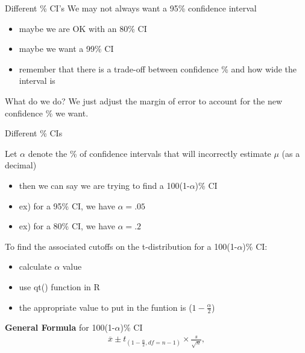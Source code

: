 \documentclass{beamer}
\begin{document}
\begin{frame}{Different \% CI's}
We may not always want a 95\% confidence interval
\begin{itemize}
    \item maybe we are OK with an 80\% CI
    \item maybe we want a 99\% CI
    \item remember that there is a trade-off between confidence \% and how wide the interval is
\end{itemize} \vspace{10mm}

What do we do? We just adjust the margin of error to account for the new confidence \% we want.
\end{frame}

\begin{frame}{Different \% CIs}
\scriptsize{
Let $\alpha$ denote the \% of confidence intervals that will incorrectly estimate $\mu$ (as a decimal)
\begin{itemize}
    \item then we can say we are trying to find a 100(1-$\alpha$)\% CI
    \item ex) for a 95\% CI, we have $\alpha = .05$
    \item ex) for a 80\% CI, we have $\alpha = .2$
\end{itemize} \vspace{6mm}

To find the associated cutoffs on the t-distribution for a 100(1-$\alpha$)\% CI:
\begin{itemize}
    \item calculate $\alpha$ value
    \item use qt() function in R
    \item the appropriate value to put in the funtion is ($1-\frac{\alpha}{2}$)
\end{itemize}} \vspace{4mm}

\textbf{General Formula} for 100(1-$\alpha$)\% CI
\begin{align*}
\overline{x} \pm t_{(1-\frac{\alpha}{2}, df=n-1)} \times \frac{s}{\sqrt{n}},
\end{align*}
\end{frame}


%
%
\end{document}
